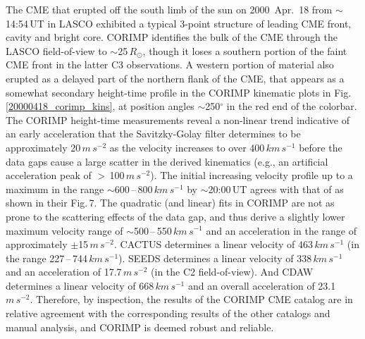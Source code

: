 \documentclass[referee,a4paper,12pt,traditabstract]{swsc}
\begin{document}
\begin{linenumbers}
The CME that erupted off the south limb of the sun on 2000~Apr.~18 from $\sim$14:54\,UT in LASCO exhibited a typical 3-point structure of leading CME front, cavity and bright core. CORIMP identifies the bulk of the CME through the LASCO field-of-view to $\sim$25\,$R_\odot$, though it loses a southern portion of the faint CME front in the latter C3 observations. A western portion of material also erupted as a delayed part of the northern flank of the CME, that appears as a somewhat secondary height-time profile in the CORIMP kinematic plots in Fig.\,\ref{20000418_corimp_kins}, at position angles $\sim$250$^{\circ}$ in the red end of the colorbar. The CORIMP height-time measurements reveal a non-linear trend indicative of an early acceleration that the Savitzky-Golay filter determines to be approximately 20\,$m\,s^{-2}$ as the velocity increases to over 400\,$km\,s^{-1}$ before the data gaps cause a large scatter in the derived kinematics (e.g., an artificial acceleration peak of $>$\,100\,$m\,s^{-2}$). The initial increasing velocity profile up to a maximum in the range $\sim$600\,--\,800\,$km\,s^{-1}$ by $\sim$20:00\,UT agrees with that of \cite{2009A&A...495..325B} as shown in their Fig.\,7. The quadratic (and linear) fits in CORIMP are not as prone to the scattering effects of the data gap, and thus derive a slightly lower maximum velocity range of $\sim$500\,--\,550\,$km\,s^{-1}$ and an acceleration in the range of approximately $\pm$15\,$m\,s^{-2}$. CACTUS determines a linear velocity of 463$\,km\,s^{-1}$ (in the range 227\,--\,744\,$km\,s^{-1}$). SEEDS determines a linear velocity of 338$\,km\,s^{-1}$ and an acceleration of 17.7\,$m\,s^{-2}$ (in the C2 field-of-view). And CDAW determines a linear velocity of 668$\,km\,s^{-1}$ and an overall acceleration of 23.1\,$m\,s^{-2}$. Therefore, by inspection, the results of the CORIMP CME catalog are in relative agreement with the corresponding results of the other catalogs and manual analysis, and CORIMP is deemed robust and reliable.







\end{linenumbers}
\end{document}
